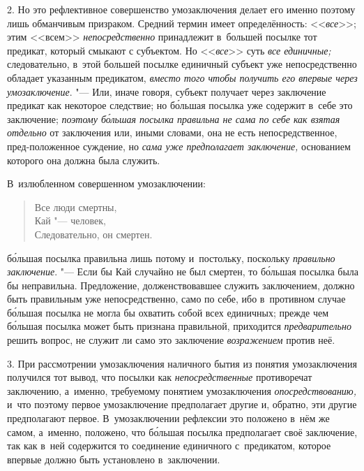 2. Но это рефлективное совершенство умозаключения делает его
именно поэтому лишь обманчивым призраком. Средний термин имеет
определённость: <<{\em все}>>; этим <<всем>> {\em непосредственно}
принадлежит в~большей посылке тот предикат, который смыкают с
субъектом. Но <<{\em все}>> суть {\em все единичные;}
следовательно, в~этой большей посылке единичный субъект уже
непосредственно обладает указанным предикатом,
{\em вместо того чтобы получить его
впервые через умозаключение}. "--- Или, иначе говоря, субъект
получает через заключение предикат как некоторое следствие; но б\'{о}льшая
посылка уже содержит в~себе это заключение;
{\em поэтому б\'{о}льшая посылка правильна не сама
по себе как взятая отдельно} от заключения или, иными
словами, она не есть непосредственное, пред-положенное суждение, но
{\em сама уже предполагает заключение,}
основанием которого она должна была служить.

В~излюбленном совершенном умозаключении:

\begin{verse}
Все люди смертны,\\
Кай "--- человек,\\
Следовательно, он смертен.
\end{verse}

\noindent б\'{о}льшая посылка правильна лишь потому и~постольку, поскольку
{\em правильно заключение}. "---
Если бы Кай случайно не был смертен, то б\'{о}льшая посылка была
бы неправильна. Предложение, долженствовавшее служить заключением, должно
быть правильным уже непосредственно, само по себе, ибо в~противном случае
б\'{о}льшая посылка не могла бы охватить собой всех единичных; прежде чем
б\'{о}льшая посылка может быть признана правильной, приходится
{\em предварительно} решить вопрос, не служит ли само это заключение
{\em возражением} против неё.

3. При рассмотрении умозаключения наличного бытия из понятия
умозаключения получился тот вывод, что посылки как {\em непосредственные}
противоречат заключению, а~именно, требуемому понятием
умозаключения {\em опосредствованию,}
и~что поэтому первое умозаключение предполагает другие и,
обратно, эти другие предполагают первое. В~умозаключении рефлексии это
положено в~нём же самом, а~именно, положено, что б\'{о}льшая
посылка предполагает своё заключение, так как в~ней содержится то
соединение единичного с~предикатом, которое впервые должно быть установлено
в~заключении.

